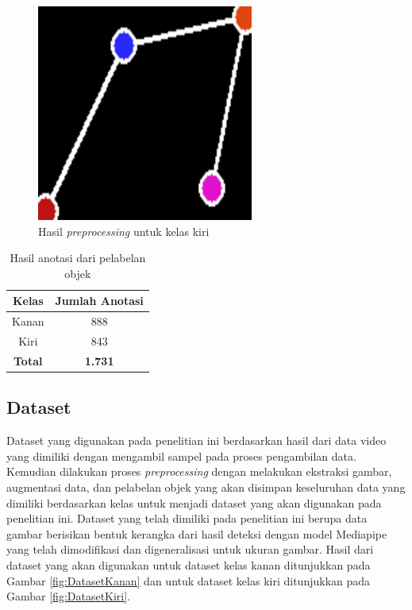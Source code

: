 \begin{figure}[H]
  \centering
  \includegraphics[scale=0.8]{gambar/dataset kiri.png}
  \caption{Hasil \emph{preprocessing} untuk kelas kiri}
  \label{fig:KelasKiri}
\end{figure}

\begin{longtable}{|c|c|}
  \caption{Hasil anotasi dari pelabelan objek}
  \label{tb:HasilAnotasi}  \\
  \hline
  \rowcolor[HTML]{C0C0C0}
  \textbf{Kelas} & \textbf{Jumlah Anotasi}  \\
  \hline
  Kanan           & 888    \\
  \hline
  Kiri            & 843    \\
  \hline
  \textbf{Total}  & \textbf{1.731}  \\
  \hline
\end{longtable}


\subsection{Dataset}
\label{subsec:Dataset}

Dataset yang digunakan pada penelitian ini berdasarkan hasil dari data video yang dimiliki dengan mengambil sampel pada proses pengambilan data. Kemudian dilakukan proses \emph{preprocessing} dengan melakukan ekstraksi gambar, augmentasi data, dan pelabelan objek yang akan disimpan keseluruhan data yang dimiliki berdasarkan kelas untuk menjadi dataset yang akan digunakan pada penelitian ini. Dataset yang telah dimiliki pada penelitian ini berupa data gambar berisikan bentuk kerangka dari hasil deteksi dengan model Mediapipe yang telah dimodifikasi dan digeneralisasi untuk ukuran gambar. Hasil dari dataset yang akan digunakan untuk dataset kelas kanan ditunjukkan pada Gambar \ref{fig:DatasetKanan} dan untuk dataset kelas kiri ditunjukkan pada Gambar \ref{fig:DatasetKiri}.

